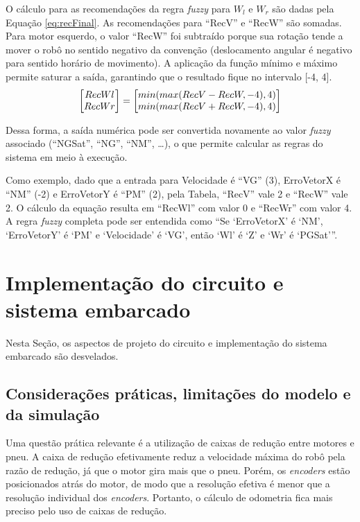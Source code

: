 	O cálculo para as recomendações da regra \textit{fuzzy} para $W_l$ e $W_r$ são dadas 
	pela Equação \ref{eq:recFinal}. As recomendações para ``RecV'' e ``RecW'' são somadas. Para
	motor esquerdo, o valor ``RecW'' foi subtraído porque sua rotação tende a mover o robô no 
	sentido negativo da convenção (deslocamento angular é negativo para sentido horário de 
	movimento). A aplicação da função mínimo e máximo permite saturar a saída, garantindo que 
	o resultado fique no intervalo [-4, 4]. 
	\begin{equation}
		\label{eq:recFinal}
			\mleft[
			\begin{matrix}
		  		RecWl\\
		  		RecWr\\
			\end{matrix}
			\mright] = \mleft[
			\begin{matrix}
		  		min(max(RecV - RecW,-4),4) \\
		  		min(max(RecV + RecW,-4),4) \\
			\end{matrix}
			\mright]
	\end{equation}
	
	Dessa forma, a saída numérica pode ser convertida novamente ao valor \textit{fuzzy} 
	associado (``NGSat'', ``NG'', ``NM'', \dots), o que permite calcular as regras do sistema
	em meio à execução.
	
	Como exemplo, dado que a entrada para Velocidade é ``VG'' (3), ErroVetorX é ``NM'' (-2) 
	e ErroVetorY é ``PM'' (2), pela Tabela, ``RecV'' vale 2 e ``RecW'' vale 2. O cálculo da
	equação resulta em ``RecWl'' com valor 0 e ``RecWr'' com valor 4. A regra \textit{fuzzy} completa
	pode ser entendida como ``Se `ErroVetorX' é `NM', `ErroVetorY' é `PM' e `Velocidade' é 
	`VG', então `Wl' é `Z' e `Wr' é `PGSat'''. 
	
\section{Implementação do circuito e sistema embarcado}

	Nesta Seção, os aspectos de projeto do circuito e implementação do sistema embarcado 
	são desvelados.

	\subsection{Considerações práticas, limitações do modelo e da simulação}
	
	Uma questão prática relevante é a utilização de caixas de redução entre motores e pneu.
	A caixa de redução efetivamente reduz a velocidade máxima do robô pela razão de redução, 
	já que o motor gira mais que o pneu. Porém, os \textit{encoders} estão posicionados atrás 
	do motor, de modo que a resolução efetiva é menor que a resolução individual dos 
	\textit{encoders}. Portanto, o cálculo de odometria fica mais preciso pelo uso de caixas
	de redução.
	
